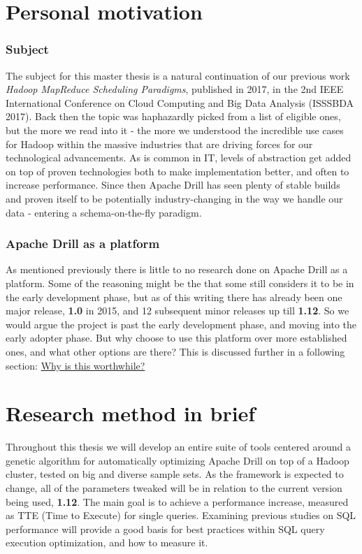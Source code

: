 \documentclass[a4paper,english]{report}
\begin{document}
		\section{Personal motivation}
			\subsubsection{Subject}
			The subject for this master thesis is a natural continuation of our previous work \emph{Hadoop MapReduce Scheduling Paradigms}, published in 2017, in the 2nd IEEE International Conference on Cloud Computing and Big Data Analysis (ISSSBDA 2017). Back then the topic was haphazardly picked from a list of eligible ones, but the more we read into it - the more we understood the incredible use cases for Hadoop within the massive industries that are driving forces for our technological advancements. As is common in IT, levels of abstraction get added on top of proven technologies both to make implementation better, and often to increase performance. Since then Apache Drill has seen plenty of stable builds and proven itself to be potentially industry-changing in the way we handle our data - entering a schema-on-the-fly paradigm.
			\subsubsection{Apache Drill as a platform}
			As mentioned previously there is little to no research done on Apache Drill as a platform. Some of the reasoning might be the that some still considers it to be in the early development phase, but as of this writing there has already been one major release, \textbf{1.0} in 2015, and 12 subsequent minor releases up till \textbf{1.12}.\cite{drill_releases} So we would argue the project is past the early development phase, and moving into the early adopter phase. But why choose to use this platform over more established ones, and what other options are there? This is discussed further in a following section: \hyperref[sec:why_drill]{Why is this worthwhile?}
		
		\section{Research method in brief}
		Throughout this thesis we will develop an entire suite of tools centered around a genetic algorithm for automatically optimizing Apache Drill on top of a Hadoop cluster, tested on big and diverse sample sets. As the framework is expected to change, all of the parameters tweaked will be in relation to the current version being used, \textbf{1.12}. The main goal is to achieve a performance increase, measured as TTE (Time to Execute) for single queries. Examining previous studies on SQL performance will provide a good basis for best practices within SQL query execution optimization, and how to measure it.
		
\end{document}
